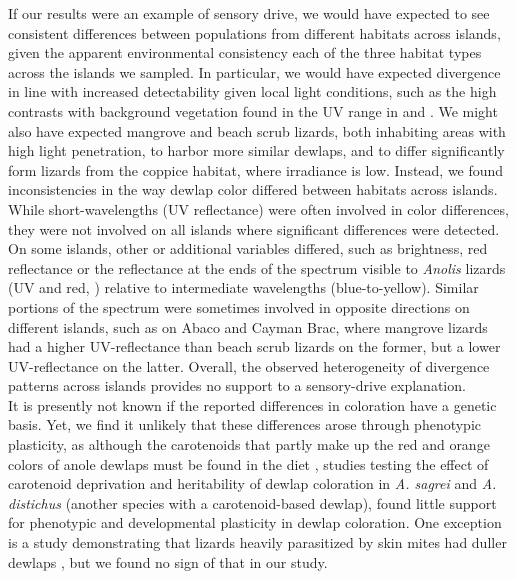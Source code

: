 If our results were an example of sensory drive, we would have expected to see consistent differences between populations from different habitats across islands, given the apparent environmental consistency each of the three habitat types across the islands we sampled. In particular, we would have expected divergence in line with increased detectability given local light conditions, such as the high contrasts with background vegetation found in the UV range in \citet{Leal2002} and \citet{Leal2004}. We might also have expected mangrove and beach scrub lizards, both inhabiting areas with high light penetration, to harbor more similar dewlaps, and to differ significantly form lizards from the coppice habitat, where irradiance is low. Instead, we found inconsistencies in the way dewlap color differed between habitats across islands. While short-wavelengths (UV reflectance) were often involved in color differences, they were not involved on all islands where significant differences were detected. On some islands, other or additional variables differed, such as brightness, red reflectance or the reflectance at the ends of the spectrum visible to \textit{Anolis} lizards (UV and red, \citealt{Lazareva2012}) relative to intermediate wavelengths (blue-to-yellow). Similar portions of the spectrum were sometimes involved in opposite directions on different islands, such as on Abaco and Cayman Brac, where mangrove lizards had a higher UV-reflectance than beach scrub lizards on the former, but a lower UV-reflectance on the latter. Overall, the observed heterogeneity of divergence patterns across islands provides no support to a sensory-drive explanation.\\


It is presently not known if the reported differences in coloration have a genetic basis. Yet, we find it unlikely that these differences arose through phenotypic plasticity, as although the carotenoids that partly make up the red and orange colors of anole dewlaps must be found in the diet \citep{Goodwin1984, Hill2002, Hill2006}, studies testing the effect of carotenoid deprivation \citep{Steffen2010, Ng2013} and heritability \citep{Cox2017} of dewlap coloration in \textit{A. sagrei} and \textit{A. distichus} (another species with a carotenoid-based dewlap), found little support for phenotypic and developmental plasticity in dewlap coloration. One exception is a study demonstrating that lizards heavily parasitized by skin mites had duller dewlaps \citep{Cook2013}, but we found no sign of that in our study.\\

